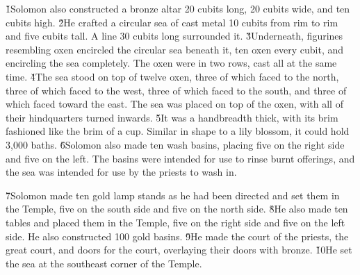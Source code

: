\v{1}Solomon also constructed a bronze altar 20 cubits long, 20 cubits wide, and ten cubits high. \v{2}He crafted a circular sea of cast metal 10 cubits from rim to rim and five cubits tall. A line 30 cubits long surrounded it. \v{3}Underneath, figurines resembling oxen encircled the circular sea beneath it, ten oxen every cubit, and encircling the sea completely. The oxen were in two rows, cast all at the same time. \v{4}The sea stood on top of twelve oxen, three of which faced to the north, three of which faced to the west, three of which faced to the south, and three of which faced toward the east. The sea was placed on top of the oxen, with all of their hindquarters turned inwards. \v{5}It was a handbreadth thick, with its brim fashioned like the brim of a cup. Similar in shape to a lily blossom, it could hold 3,000 baths. \v{6}Solomon also made ten wash basins, placing five on the right side and five on the left. The basins were intended for use to rinse burnt offerings, and the sea was intended for use by the priests to wash in.

\v{7}Solomon made ten gold lamp stands as he had been directed and set them in the Temple, five on the south side and five on the north side. \v{8}He also made ten tables and placed them in the Temple, five on the right side and five on the left side. He also constructed 100 gold basins. \v{9}He made the court of the priests, the great court, and doors for the court, overlaying their doors with bronze. \v{10}He set the sea at the southeast corner of the Temple.

